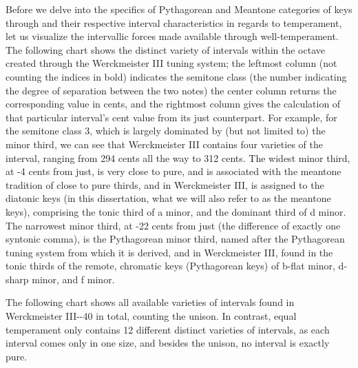 Before we delve into the specifics of Pythagorean and Meantone
categories of keys through and their respective interval characteristics
in regards to temperament, let us visualize the intervallic forces made
available through well-temperament. The following chart shows the
distinct variety of intervals within the octave created through the
Werckmeister III tuning system; the leftmost column (not counting the
indices in bold) indicates the semitone class (the number indicating the
degree of separation between the two notes) the center column returns
the corresponding value in cents, and the rightmost column gives the
calculation of that particular interval's cent value from its just
counterpart. For example, for the semitone class 3, which is largely
dominated by (but not limited to) the minor third, we can see that
Werckmeister III contains four varieties of the interval, ranging from
294 cents all the way to 312 cents. The widest minor third, at -4 cents
from just, is very close to pure, and is associated with the meantone
tradition of close to pure thirds, and in Werckmeister III, is assigned
to the diatonic keys (in this dissertation, what we will also refer to
as the meantone keys), comprising the tonic third of a minor, and the
dominant third of d minor. The narrowest minor third, at -22 cents from
just (the difference of exactly one syntonic comma), is the Pythagorean
minor third, named after the Pythagorean tuning system from which it is
derived, and in Werckmeister III, found in the tonic thirds of the
remote, chromatic keys (Pythagorean keys) of b-flat minor, d-sharp
minor, and f minor.

The following chart shows all available varieties of intervals found in
Werckmeister III-\/-40 in total, counting the unison. In contrast, equal
temperament only contains 12 different distinct varieties of intervals,
as each interval comes only in one size, and besides the unison, no
interval is exactly pure.


